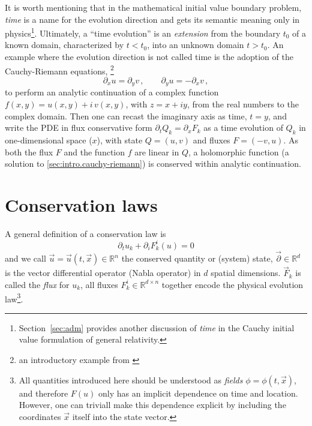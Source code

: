 It is worth mentioning that in the mathematical initial value boundary problem,
\emph{time} is a name for the evolution direction and gets its semantic
meaning only in physics\footnote{
	Section~\vref{sec:adm} provides another discussion of \emph{time} in the
	Cauchy initial value formulation of general relativity.
}.
Ultimately, a ``time evolution'' is an \emph{extension} from the boundary $t_0$
of a known domain, characterized by $t < t_0$, into an unknown domain $t > t_0$.
An example where the evolution direction is not called time is the adoption
of the Cauchy-Riemann equations,
\footnote{an introductory example from \cite{Toro99}}
\begin{equation}\label{sec:intro.cauchy-riemann}
\partial_ x u = \partial_y v
\,,\quad\quad \partial_y u = - \partial_x v
\,,
\end{equation}
to perform an analytic continuation of a complex function
$f(x,y)=u(x,y) + i\,v(x,y)$, with $z=x+iy$, from the real numbers to the
complex domain. Then one can recast the imaginary axis as time, $t=y$, and write
the PDE in flux conservative form $\partial_t Q_k = \partial_x F_k$
as a time evolution of $Q_k$ in one-dimensional space ($x$), with
state $Q=(u,v)$ and fluxes $F=(-v, u)$. As both the flux $F$ and the function 
$f$ are linear in $Q$, a holomorphic function (\ie a solution to 
\eqref{sec:intro.cauchy-riemann}) is conserved within analytic continuation.
%

\section{Conservation laws}\label{sec:conservation-laws}
A general definition of a conservation law is
\begin{equation}\label{intro:conservation-law}
\partial_t u_k + \partial_i F^i_k(u) = 0
\end{equation}
and we call $\vec u=\vec u(t, \vec x) \in \mathbb R^n$ the conserved quantity or
(system) state, $\vec \partial \in \mathbb R^d$ is the vector differential operator
(Nabla operator) in $d$ spatial dimensions. $\vec F_k$ is called the \emph{flux} for 
$u_k$, all fluxes $F^i_k \in \mathbb R^{d\times n}$ together
encode the physical evolution law\footnote{
  All quantities introduced here should be understood as \emph{fields}
  $\phi=\phi(t,\vec x)$, and therefore $F(u)$ only has an implicit
  dependence on time and location. However, one can triviall make this dependence
  explicit by including the coordinates $\vec x$ itself into the state vector.
}.

